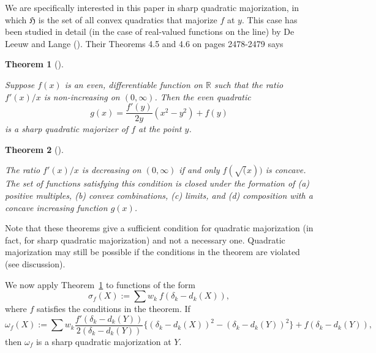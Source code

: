 \documentclass[
  12pt,
  letterpaper,
  DIV=11,
  numbers=noendperiod]{scrartcl}
\theoremstyle{plain}
\newtheorem{theorem}{Theorem}[section]
\theoremstyle{remark}
\begin{document}
We are specifically interested in this paper in sharp quadratic
majorization, in which \(\mathfrak{H}\) is the set of all convex
quadratics that majorize \(f\) at \(y\). This case has been studied in
detail (in the case of real-valued functions on the line) by De Leeuw
and Lange (). Their Theorems 4.5
and 4.6 on pages 2478-2479 says

\begin{theorem}[]\protect\hypertarget{thm-wght}{}\label{thm-wght}

Suppose \(f(x)\) is an even, differentiable function on \(\mathbb{R}\)
such that the ratio \(f'(x)/x\) is non-increasing on \((0,\infty)\).
Then the even quadratic \begin{equation}
g(x)=\frac{f'(y)}{2y}(x^2-y^2)+f(y)\label{eq:sharp}
\end{equation} is a sharp quadratic majorizer of \(f\) at the point
\(y\).

\end{theorem}

\begin{theorem}[]\protect\hypertarget{thm-sqrt}{}\label{thm-sqrt}

The ratio \(f'(x)/x\) is decreasing on \((0,\infty)\) if and only
\(f(\sqrt(x))\) is concave. The set of functions satisfying this
condition is closed under the formation of (a) positive multiples, (b)
convex combinations, (c) limits, and (d) composition with a concave
increasing function \(g(x)\).

\end{theorem}

Note that these theorems give a sufficient condition for quadratic
majorization (in fact, for sharp quadratic majorization) and not a
necessary one. Quadratic majorization may still be possible if the
conditions in the theorem are violated (see discussion).

We now apply Theorem~\ref{thm-wght} to functions of the form
\begin{equation}
\sigma_f(X):=\sum w_k\ f(\delta_k-d_k(X)),\label{eq:fstressdef}
\end{equation} where \(f\) satisfies the conditions in the theorem. If
\begin{equation}
\omega_f(X):=\sum w_k\frac{f'(\delta_k-d_k(Y))}{2(\delta_k-d_k(Y))}\{(\delta_k-d_k(X))^2-(\delta_k-d_k(Y))^2\}+f(\delta_k-d_k(Y)),\label{eq:fstressmaj}
\end{equation} then \(\omega_f\) is a sharp quadratic majorization at
\(Y\).
\end{document}
